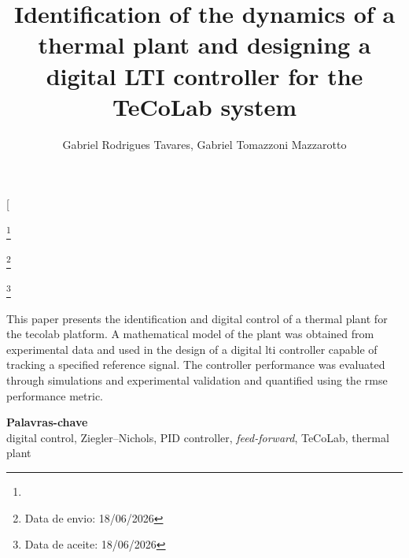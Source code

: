 \documentclass[journal,twoside,a4paper]{SCIndustria}
\newcommand\blfootnote[1]{\begingroup
  \renewcommand\thefootnote{}\footnote{#1}\addtocounter{footnote}{-1}\endgroup
}
\begin{document}
\title{Identification of the dynamics of a thermal plant and designing a digital LTI controller for the TeCoLab system}

\author{Gabriel Rodrigues Tavares, Gabriel Tomazzoni Mazzarotto}

\twocolumn[
\begin{@twocolumnfalse}

\maketitle
\blfootnote{}
\blfootnote{Data de envio: 18/06/2026}
\blfootnote{Data de aceite: 18/06/2026}
\vspace{-1cm}
\begin{resumo}
This paper presents the identification and digital control of a thermal plant for the \gls{tecolab} platform. A mathematical model of the plant was obtained from experimental data and used in the design of a digital \gls{lti} controller capable of tracking a specified reference signal. The controller performance was evaluated through simulations and experimental validation and quantified using the \gls{rmse} performance metric.
\end{resumo}
{\small
\begin{center}
{\bfseries Palavras-chave}\\
digital control, Ziegler--Nichols, PID controller, \textit{feed-forward}, TeCoLab, thermal plant
\end{center}
} \vspace{.5cm}
\end{@twocolumnfalse}
\end{document}
